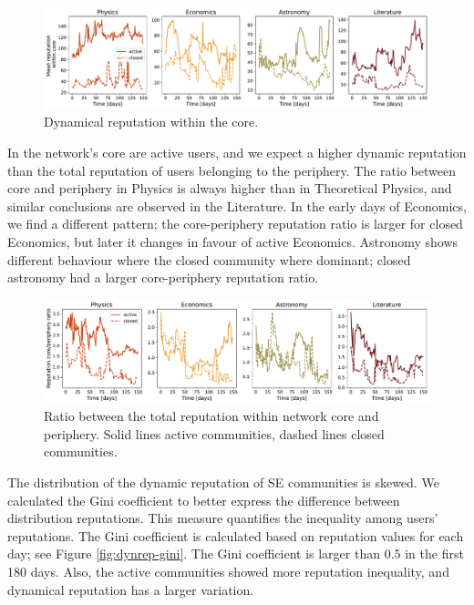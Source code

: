 \begin{figure}[h]
	\centering
	\includegraphics[width=\linewidth]{figures/stackexchange/core_reputation.pdf}
	\caption{Dynamical reputation within the core.}
	\label{fig:dr_core}
\end{figure}

In the network's core are active users, and we expect a higher dynamic reputation than the total reputation of users belonging to the periphery. The ratio between core and periphery in Physics is always higher than in Theoretical Physics, and similar conclusions are observed in the Literature. In the early days of Economics, we find a different pattern; the core-periphery reputation ratio is larger for closed Economics, but later it changes in favour of active Economics. Astronomy shows different behaviour where the closed community where dominant; closed astronomy had a larger core-periphery reputation ratio. 

\begin{figure}[h!]
	\centering
	\includegraphics[width=\linewidth]{figures/stackexchange/core_per_ratio_reputation.pdf}
	\caption[Ratio between the total reputation within network core and periphery.]{Ratio between the total reputation within network core and periphery. Solid lines active communities, dashed lines closed communities.}
	\label{fig:dr_core_per}
\end{figure}

The distribution of the dynamic reputation of SE communities is skewed. We calculated the Gini coefficient to better express the difference between distribution reputations. This measure quantifies the inequality among users’ reputations. The Gini coefficient is calculated based on reputation values for each day; see Figure \ref{fig:dynrep-gini}. The Gini coefficient is larger than $0.5$ in the first 180 days. Also, the active communities showed more reputation inequality, and dynamical reputation has a larger variation. 


